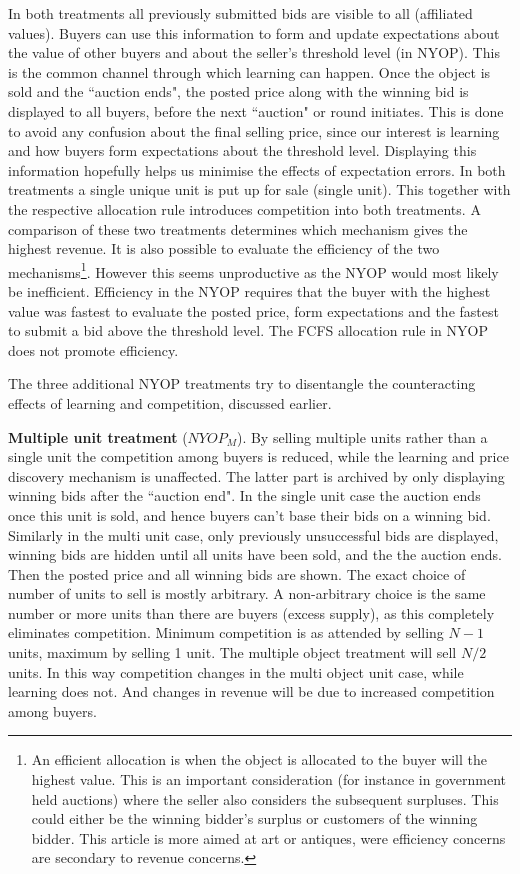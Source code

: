 \documentclass[a4paper,12pt]{article}
\begin{document}
	In both treatments all previously submitted bids are visible to all (affiliated values). Buyers can use this information to form and update expectations about the value of other buyers and about the seller's threshold level (in NYOP). This is the common channel through which learning can happen. Once the object is sold and the ``auction ends", the posted price along with the winning bid is displayed to all buyers, before the next ``auction" or round initiates. This is done to avoid any confusion about the final selling price, since our interest is learning and how buyers form expectations about the threshold level. Displaying this information hopefully helps us minimise the effects of expectation errors. 
	In both treatments a single unique unit is put up for sale (single unit). This together with the respective allocation rule introduces competition into both treatments. A comparison of these two treatments determines which mechanism gives the highest revenue. It is also possible to evaluate the efficiency of the two mechanisms\footnote{An efficient allocation is when the object is allocated to the buyer will the highest value. This is an important consideration (for instance in government held auctions) where the seller also considers the subsequent surpluses. This could either be the winning bidder's surplus or customers of the winning bidder. This article is more aimed at art or antiques, were efficiency concerns are secondary to revenue concerns.}. However this seems unproductive as the NYOP would most likely be inefficient. Efficiency in the NYOP requires that the buyer with the highest value was fastest to evaluate the posted price, form expectations and the fastest to submit a bid above the threshold level. The FCFS allocation rule in NYOP does not promote efficiency. 

	The three additional NYOP treatments try to disentangle the counteracting effects of learning and competition, discussed earlier.

	{\bf Multiple unit treatment} ($NYOP_M$). 
	By selling multiple units rather than a single unit the competition among buyers is reduced, while the learning and price discovery mechanism is unaffected. The latter part is archived by only displaying winning bids after the ``auction end". In the single unit case the auction ends once this unit is sold, and hence buyers can't base their bids on a winning bid. Similarly in the multi unit case, only previously unsuccessful bids are displayed, winning bids are hidden until all units have been sold, and the the auction ends. Then the posted price and all winning bids are shown. The exact choice of number of units to sell is mostly arbitrary. A non-arbitrary choice is the same number or more units than there are buyers (excess supply), as this completely eliminates competition. Minimum competition is as attended by selling $N-1$ units, maximum by selling 1 unit. The multiple object treatment will sell $N/2$ units. In this way competition changes in the multi object unit case, while learning does not. And changes in revenue will be due to increased competition among buyers.
\end{document}
